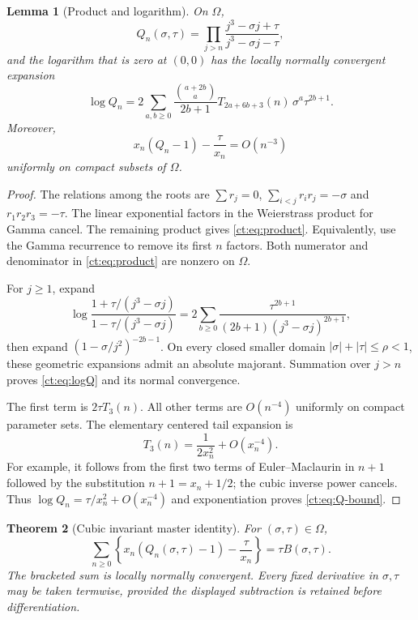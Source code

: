\documentclass[11pt]{article}
\numberwithin{equation}{section}
\newtheorem{theorem}{Theorem}[section]
\newtheorem{lemma}[theorem]{Lemma}
\theoremstyle{definition}\newtheorem{definition}[theorem]{Definition}
\theoremstyle{remark}\newtheorem{remark}[theorem]{Remark}
\newcommand{\Om}{\Omega}
\begin{document}
\begin{lemma}[Product and logarithm]\label{ct:lem:product}
On $\Om$,
\begin{equation}\label{ct:eq:product}
 Q_n(\sigma,\tau)
   =\prod_{j>n}\frac{j^3-\sigma j+\tau}{j^3-\sigma j-\tau},
\end{equation}
and the logarithm that is zero at $(0,0)$ has the locally normally
convergent expansion
\begin{equation}\label{ct:eq:logQ}
 \log Q_n
 =2\sum_{a,b\ge0}\frac{\binom{a+2b}{a}}{2b+1}
       T_{2a+6b+3}(n)\,\sigma^a\tau^{2b+1}.
\end{equation}
Moreover,
\begin{equation}\label{ct:eq:Q-bound}
 x_n(Q_n-1)-\frac{\tau}{x_n}=O(n^{-3})
\end{equation}
uniformly on compact subsets of $\Om$.
\end{lemma}
\begin{proof}
The relations among the roots are
$\sum r_j=0$, $\sum_{i<j}r_ir_j=-\sigma$ and $r_1r_2r_3=-\tau$.
The linear exponential factors in the Weierstrass product for Gamma cancel.
The remaining product gives \eqref{ct:eq:product}. Equivalently, use the
Gamma recurrence to remove its first $n$ factors. Both numerator and
denominator in \eqref{ct:eq:product} are nonzero on $\Om$.

For $j\ge1$, expand
\[
 \log\frac{1+\tau/(j^3-\sigma j)}{1-\tau/(j^3-\sigma j)}
   =2\sum_{b\ge0}\frac{\tau^{2b+1}}{(2b+1)(j^3-\sigma j)^{2b+1}},
\]
then expand $(1-\sigma/j^2)^{-2b-1}$. On every closed smaller domain
$|\sigma|+|\tau|\le\rho<1$, these geometric expansions admit an absolute
majorant. Summation over $j>n$ proves \eqref{ct:eq:logQ} and its normal
convergence.

The first term is $2\tau T_3(n)$. All other terms are $O(n^{-4})$ uniformly
on compact parameter sets. The elementary centered tail expansion is
\[
 T_3(n)=\frac1{2x_n^2}+O(x_n^{-4}).
\]
For example, it follows from the first two terms of Euler--Maclaurin in
$n+1$ followed by the substitution $n+1=x_n+1/2$; the cubic inverse power
cancels. Thus $\log Q_n=\tau/x_n^2+O(x_n^{-4})$ and exponentiation proves
\eqref{ct:eq:Q-bound}.
\end{proof}

\begin{theorem}[Cubic invariant master identity]\label{ct:thm:master}
For $(\sigma,\tau)\in\Om$,
\begin{equation}\label{ct:eq:master}
 \sum_{n\ge0}\left\{x_n(Q_n(\sigma,\tau)-1)-\frac{\tau}{x_n}\right\}
       =\tau B(\sigma,\tau).
\end{equation}
The bracketed sum is locally normally convergent. Every fixed derivative
in $\sigma,\tau$ may be taken termwise, provided the displayed subtraction
is retained before differentiation.
\end{theorem}
\end{document}
